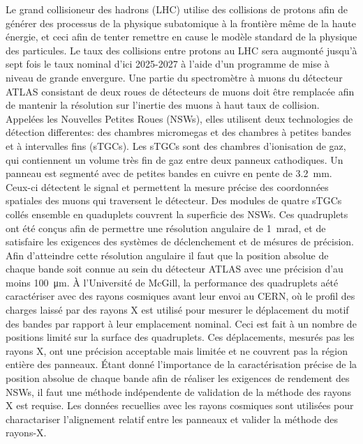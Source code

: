 Le grand collisioneur des hadrons (LHC) utilise des collisions de protons afin de g\'{e}n\'{e}rer des processus de la physique subatomique \`{a} la fronti\`{e}re m\^{e}me de la haute \'{e}nergie, et ceci afin de tenter remettre en cause le mod\`{e}le standard de la physique des particules. Le taux des collisions entre protons au LHC sera augmont\'{e} jusqu'\`{a} sept fois le taux nominal d'ici 2025-2027 \`{a} l'aide d'un programme de mise \`{a} niveau de grande envergure. Une partie du spectrom\`{e}tre \`{a} muons du d\'{e}tecteur ATLAS consistant de deux roues de d\'{e}tecteurs de muons doit \^{e}tre remplac\'{e}e afin de mantenir la r\'{e}solution sur l'inertie des muons \`{a} haut taux de collision. Appel\'{e}es les Nouvelles Petites Roues (NSWs), elles utilisent deux technologies de d\'{e}tection differentes: des chambres micromegas et des chambres \`{a} petites bandes et \`{a} intervalles fins (sTGCs). Les sTGCs sont des chambres d'ionisation de gaz, qui contiennent un volume tr\`{e}s fin de gaz entre deux panneux cathodiques. Un panneau est segment\'{e} avec de petites bandes en cuivre en pente de \SI{3.2}{mm}. Ceux-ci d\'{e}tectent le signal et permettent la mesure pr\'{e}cise des coordonn\'{e}es spatiales des muons qui traversent le d\'{e}tecteur. Des modules de quatre sTGCs coll\'{e}s ensemble en quaduplets couvrent la superficie des NSWs. Ces quadruplets ont \'{e}t\'{e} con\c{c}us afin de permettre une r\'{e}solution angulaire de \SI{1}{mrad}, et de satisfaire les exigences des syst\`{e}mes de d\'{e}clenchement et de m\'{e}sures de pr\'{e}cision. Afin d'atteindre cette r\'{e}solution angulaire il faut que la position absolue de chaque bande soit connue au sein du d\'{e}tecteur ATLAS avec une pr\'{e}cision d'au moins \SI{100}{\micro\meter}. \`{A} l'Universit\'{e} de McGill, la performance des quadruplets a\'{e}t\'{e} caract\'{e}riser avec des rayons cosmiques avant leur envoi au CERN, o\`{u} le profil des charges laiss\'{e} par des rayons X est utilis\'{e} pour mesurer le d\'{e}placement du motif des bandes par rapport \`{a} leur emplacement nominal. Ceci est fait \`{a} un nombre de positions limit\'{e} sur la surface des quadruplets. Ces d\'{e}placements, mesur\'{e}s pas les rayons X, ont une pr\'{e}cision acceptable mais limit\'{e}e et ne couvrent pas la r\'{e}gion enti\`{e}re des panneaux. \'{E}tant donn\'{e} l'importance de la caract\'{e}risation pr\'{e}cise de la position absolue de chaque bande afin de r\'{e}aliser les exigences de rendement des NSWs, il faut une m\'{e}thode ind\'{e}pendente de validation de la m\'{e}thode des rayons X est requise. Les donn\'{e}es recuellies avec les rayons cosmiques sont utilis\'{e}es pour charactariser l'alignement relatif entre les panneaux et valider la m\'{e}thode des rayons-X.

